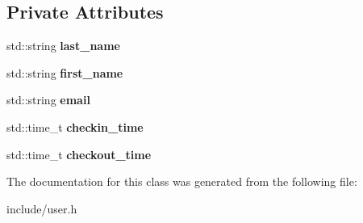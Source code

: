 \subsection*{Private Attributes}
\begin{DoxyCompactItemize}
\item 
\mbox{\label{classUser_a5eb21bb4ad461b944188a18de1badc73}} 
std\+::string {\bfseries last\+\_\+name}
\item 
\mbox{\label{classUser_a37bb6ab1204f4304099e3e91ac8ec6ed}} 
std\+::string {\bfseries first\+\_\+name}
\item 
\mbox{\label{classUser_ac35b7c63228119cb91acdbd7ed32b8cb}} 
std\+::string {\bfseries email}
\item 
\mbox{\label{classUser_a861c5e388072ecb1f3d7cd17496faf3d}} 
std\+::time\+\_\+t {\bfseries checkin\+\_\+time}
\item 
\mbox{\label{classUser_a160ac77b4642af5710560264bf715333}} 
std\+::time\+\_\+t {\bfseries checkout\+\_\+time}
\end{DoxyCompactItemize}


The documentation for this class was generated from the following file\+:\begin{DoxyCompactItemize}
\item 
include/user.\+h\end{DoxyCompactItemize}
